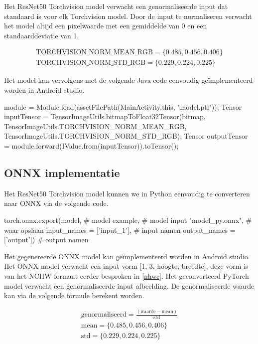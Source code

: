 Het ResNet50 Torchvision model verwacht een genormaliseerde input dat standaard is voor elk Torchvision model.
Door de input te normaliseren verwacht het model altijd een pixelwaarde met een gemiddelde van 0 en een standaarddeviatie van 1.

\begin{equation}
    \begin{aligned}
	\textrm{TORCHVISION\_NORM\_MEAN\_RGB}  = \{0.485, 0.456, 0.406\} \\
	\textrm{TORCHVISION\_NORM\_STD\_RGB}  = \{0.229, 0.224, 0.225\}
    \end{aligned}
\end{equation}

Het model kan vervolgens met de volgende Java code eenvoudig ge\"implementeerd worden in Android studio. 

\begin{python}
module = Module.load(assetFilePath(MainActivity.this, "model.ptl"));
Tensor inputTensor = TensorImageUtils.bitmapToFloat32Tensor(bitmap,
            TensorImageUtils.TORCHVISION_NORM_MEAN_RGB, 
            TensorImageUtils.TORCHVISION_NORM_STD_RGB);
Tensor outputTensor = module.forward(IValue.from(inputTensor)).toTensor();
\end{python}

\subsection{ONNX implementatie} \label{py_onnx}
Het ResNet50 Torchvision model kunnen we in Python eenvoudig te converteren naar ONNX via de volgende code.

\begin{python}
torch.onnx.export(model, # model 
    example,             # model input
    "model_py.onnx",     # waar opslaan
    input_names = ['input_1'], # input namen
    output_names = ['output']) # output namen    
\end{python}

Het gegenereerde ONNX model kan ge\"implementeerd worden in Android studio.
Het ONNX model verwacht een input vorm [1, 3, hoogte, breedte], deze vorm is van het NCHW formaat eerder besproken in \ref{nhwc}.
Het geconverteerd PyTorch model verwacht een genormaliseerde input afbeelding.
De genormaliseerde waarde kan via de volgende formule berekent worden.

\begin{equation}
    \begin{aligned}
	\textrm{genormaliseerd}  = \frac{(\textrm{waarde} - \textrm{mean})}{\textrm{std}} \\
    \textrm{mean}  = \{0.485, 0.456, 0.406\} \\
	\textrm{std}  = \{0.229, 0.224, 0.225\}
\end{aligned}
\end{equation}

